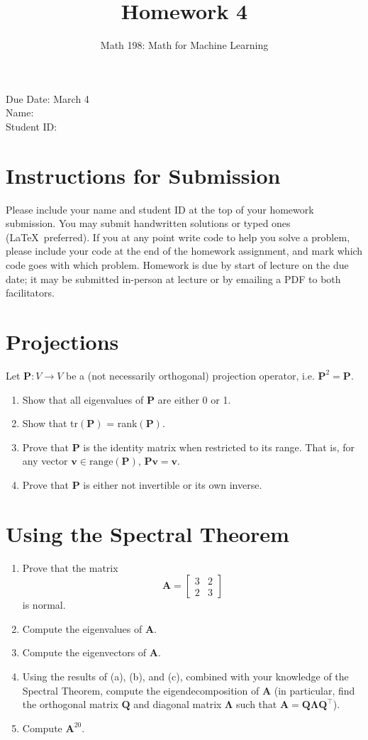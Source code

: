 \documentclass{article}
\title{Homework 4}
\author{Math 198: Math for Machine Learning}
\date{}
\begin{document}
\maketitle

\noindent
Due Date: March 4 \\
Name: \\
Student ID:

\section*{Instructions for Submission}
Please include your name and student ID at the top of your homework submission. You may submit handwritten solutions or typed ones (\LaTeX\ preferred). If you at any point write code to help you solve a problem, please include your code at the end of the homework assignment, and mark which code goes with which problem. Homework is due by start of lecture on the due date; it may be submitted in-person at lecture or by emailing a PDF to both facilitators.

\section{Projections}
Let $\mathbf{P}: V \to V$ be a (not necessarily orthogonal) projection operator, i.e. $\mathbf{P}^2 = \mathbf{P}$. 
\begin{enumerate}
\item Show that all eigenvalues of $\mathbf{P}$ are either 0 or 1. 
\item Show that tr$(\mathbf{P})$ = rank$(\mathbf{P})$. 
\item Prove that $\mathbf{P}$ is the identity matrix when restricted to its range. That is, for any vector $\mathbf{v} \in \text{range}(\mathbf{P})$, $\mathbf{Pv} = \mathbf{v}$. 
\item Prove that $\mathbf{P}$ is either not invertible or its own inverse. 
\end{enumerate}

\section{Using the Spectral Theorem}
\begin{enumerate}[label=\arabic*.]
\item Prove that the matrix $$\mathbf{A} = \begin{bmatrix} 3 & 2 \\ 2 & 3 \end{bmatrix}$$ is normal. 
\item Compute the eigenvalues of $\mathbf{A}$.
\item Compute the eigenvectors of $\mathbf{A}$.
\item Using the results of (a), (b), and (c), combined with your knowledge of the Spectral Theorem, compute the eigendecomposition of $\mathbf{A}$ (in particular, find the orthogonal matrix $\mathbf{Q}$ and diagonal matrix $\mathbf{\Lambda}$ such that $\mathbf{A} = \mathbf{Q\Lambda Q^{\top}}$).
\item Compute $\mathbf{A}^{20}$.
\end{enumerate}
\end{document}
